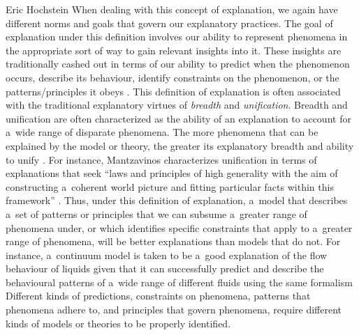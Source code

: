 \begin{artengenv}{Eric Hochstein}
When dealing with this concept of explanation, we again have different norms and goals that govern our explanatory practices. The goal of explanation under this definition involves our ability to represent phenomena in the appropriate sort of way to gain relevant insights into it. These insights are traditionally cashed out in terms of our ability to predict when the phenomenon occurs, describe its behaviour, identify constraints on the phenomenon, or the patterns/principles it obeys
\parencites[e.g.,][]{batterman_multiple_2000}{batterman_devil_2002}{batterman_minimal_2014}{chirimuuta_minimal_2014}. %
 This definition of explanation is often associated with the traditional explanatory virtues of \textit{breadth} and \textit{unification}. Breadth and unification are often characterized as the ability of an explanation to account for a~wide range of disparate phenomena. The more phenomena that can be explained by the model or theory, the greater its explanatory breadth and ability to unify 
\parencites[see,][]{mackonis_inference_2013}{lombrozo_explanatory_2016}{mantzavinos_explanatory_2016}. %
 For instance, Mantzavinos characterizes unification in terms of explanations that seek ``laws and principles of high generality with the aim of constructing a~coherent world picture and fitting particular facts within this framework'' 
\parencite[][p.6, footnote]{mantzavinos_explanatory_2016}. %
 Thus, under this definition of explanation, a~model that describes a~set of patterns or principles that we can subsume a~greater range of phenomena under, or which identifies specific constraints that apply to a~greater range of phenomena, will be better explanations than models that do not. For instance, a~continuum model is taken to be a~good explanation of the flow behaviour of liquids given that it can successfully predict and describe the behavioural patterns of a~wide range of different fluids using the same formalism 
\parencites[see,][]{batterman_minimal_2014}{izadi_building_2014}{bokulich_representing_2018}
 Different kinds of predictions, constraints on phenomena, patterns that phenomena adhere to, and principles that govern phenomena, require different kinds of models or theories to be properly identified.


\end{artengenv}
